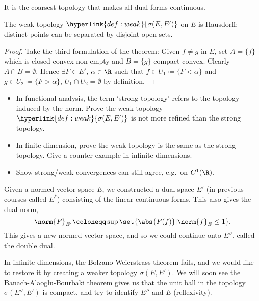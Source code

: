 \documentclass[twoside]{article}
\begin{document}
It is the coarsest topology that makes all dual forms continuous.
\begin{prop}
    The weak topology $\hyperlink{def:weak}{\sigma(E, E')}$ on $E$ is Hausdorff: distinct points can be separated by disjoint open sets.
\end{prop}
\begin{proof}
    Take the third formulation of the  theorem:
    Given $f \neq g$ in $E$, set $A = \{f\}$ which is closed convex non-empty and $B=\{g\}$ compact convex. Clearly $A \cap B = \emptyset$.
    Hence $\exists F \in E'$, $\alpha \in \R$ such that $f \in U_1 \coloneqq \{F < \alpha\}$ and $g \in U_2 \coloneqq \{F > \alpha\}$, $U_1 \cap U_2 = \emptyset$ by definition.
\end{proof}
\begin{remark}\leavevmode
    \begin{itemize}
        \item In functional analysis, the term `strong topology' refers to the topology induced by the norm.
        Prove the weak topology $\hyperlink{def:weak}{\sigma(E, E')}$ is not more refined than the strong topology.
        \item In finite dimension, prove the weak topology is the same as the strong topology. Give a counter-example in infinite dimensions.
        \item Show strong/weak convergences can still agree, e.g.\ on $C^1(\R)$.
    \end{itemize}
\end{remark}
\begin{remark}
    Given a normed vector space $E$, we constructed a dual space $E'$ (in previous courses called $E^*$) consisting of the linear continuous forms.
    This also gives the dual norm,
    \begin{equation*}
        \norm{F}_{E'} \coloneqq \sup\set{\abs{F(f)} | \norm{f}_E \leq 1}.
    \end{equation*}
    This gives a new normed vector space, and so we could continue onto $E''$, called the double dual.

    In infinite dimensions, the Bolzano-Weierstrass theorem fails, and we would like to restore it by creating a weaker topology $\sigma(E, E')$.
    We will soon see the Banach-Alaoglu-Bourbaki theorem gives us that the unit ball in the topology $\sigma(E'', E')$ is compact, and try to identify $E''$ and $E$ (reflexivity).
\end{remark}
\end{document}
